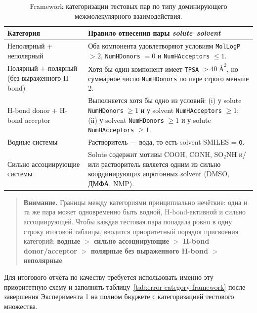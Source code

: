 \documentclass[11pt]{article}
\newcommand{\smarts}[1]{\nolinkurl{#1}}
\newcommand{\warnnote}[1]{\begin{quote}\textbf{Внимание.} #1\end{quote}}
\begin{document}
\begin{table}[H]
\centering
\small
\setlength{\tabcolsep}{3.5pt}
\begin{tabularx}{\textwidth}{|P{3.6cm}|Y|}
\hline
Категория & Правило отнесения пары \textit{solute--solvent} \\
\hline
Неполярный + неполярный & Оба компонента удовлетворяют условиям \texttt{MolLogP} $> 2$, \texttt{NumHDonors} $= 0$ и \texttt{NumHAcceptors} $\le 1$. \\
\hline
Полярный + полярный (без выраженного H-bond) & Хотя бы один компонент имеет \texttt{TPSA} $> 40~\text{\AA}^2$, но суммарное число \texttt{NumHDonors} по паре строго меньше 2. \\
\hline
H-bond donor + H-bond acceptor & Выполняется хотя бы одно из условий: (i) у solute \texttt{NumHDonors} $\ge 1$ и у solvent \texttt{NumHAcceptors} $\ge 1$; (ii) у solvent \texttt{NumHDonors} $\ge 1$ и у solute \texttt{NumHAcceptors} $\ge 1$. \\
\hline
Водные системы & Растворитель --- вода, то есть solvent SMILES = \smarts{O}. \\
\hline
Сильно ассоциирующие системы & Solute содержит мотивы COOH, CONH, SO$_2$NH и/или растворитель является одним из сильно координирующих апротонных solvent (DMSO, ДМФА, NMP). \\
\hline
\end{tabularx}
\caption{Framework категоризации тестовых пар по типу доминирующего межмолекулярного взаимодействия.}
\label{tab:error-category-rules}
\end{table}

\warnnote{Границы между категориями принципиально нечёткие: одна и та же пара может одновременно быть водной, H-bond-активной и сильно ассоциирующей. Чтобы каждая тестовая пара попадала ровно в одну строку итоговой таблицы, вводится приоритетный порядок присвоения категорий: \textbf{водные} $>$ \textbf{сильно ассоциирующие} $>$ \textbf{H-bond donor/acceptor} $>$ \textbf{полярные без выраженного H-bond} $>$ \textbf{неполярные}.}

Для итогового отчёта по качеству требуется использовать именно эту приоритетную схему и заполнять таблицу~\ref{tab:error-category-framework} после завершения Эксперимента 1 на полном бюджете с категоризацией тестового множества.
\end{document}
